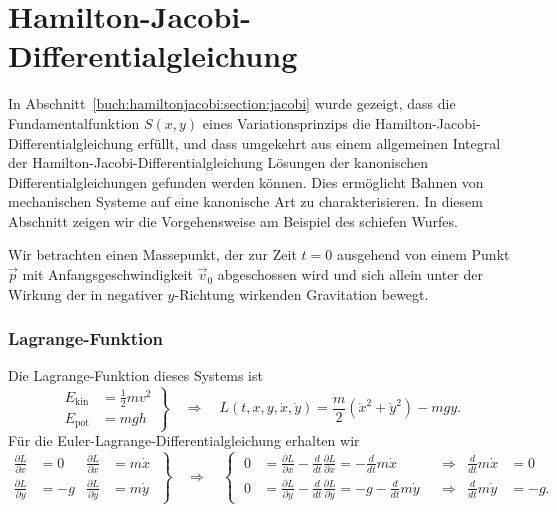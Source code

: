 %
%
%
\section{Hamilton-Jacobi-Differentialgleichung
\label{buch:mechanik:section:jacobi}}
In Abschnitt~\ref{buch:hamiltonjacobi:section:jacobi} wurde gezeigt,
dass die Fundamentalfunktion $S(x,y)$ eines Variationsprinzips 
die Hamilton-Jacobi-Differentialgleichung erfüllt, und dass umgekehrt
aus einem allgemeinen Integral der Hamilton-Jacobi-Differentialgleichung
Lösungen der kanonischen Differentialgleichungen gefunden werden können.
Dies ermöglicht Bahnen von mechanischen Systeme auf eine kanonische
Art zu charakterisieren.
In diesem Abschnitt zeigen wir die Vorgehensweise am Beispiel
des schiefen Wurfes.

Wir betrachten einen Massepunkt, der zur Zeit $t=0$ ausgehend von einem
Punkt $\vec{p}$ mit Anfangsgeschwindigkeit $\vec{v}_0$ abgeschossen
wird und sich allein unter der Wirkung der in negativer $y$-Richtung
wirkenden Gravitation bewegt.

%
%
\subsubsection{Lagrange-Funktion}
Die Lagrange-Funktion dieses Systems ist
\[
\left.
\begin{aligned}
E_{\text{kin}}
&=
\frac12 mv^2
\\
E_{\text{pot}}
&=
mgh
\end{aligned}
\right\}
\quad\Rightarrow\quad
L(t,x,y,\dot{x},\dot{y})
=
\frac{m}2 (\dot{x}^2 + \dot{y}^2)
-
mgy.
\]
Für die Euler-Lagrange-Differentialgleichung erhalten wir
\begin{equation}
\left.
\begin{aligned}
\frac{\partial L}{\partial x}
&=
0
&
\frac{\partial L}{\partial \dot{x}}
&=
m\dot{x}
\\
\frac{\partial L}{\partial y}
&=
-g
&
\frac{\partial L}{\partial \dot{y}}
&=
m\dot{y}
\end{aligned}
\;\right\}
\quad\Rightarrow\quad
\left\{\;
\begin{aligned}
0
&=
\frac{\partial L}{\partial x}-\frac{d}{dt}\frac{\partial L}{\partial\dot{x}}
=
-\frac{d}{dt}m\dot{x}
&&\Rightarrow&\frac{d}{dt}m\dot{x}&=0
\\
0
&=
\frac{\partial L}{\partial y}-\frac{d}{dt}\frac{\partial L}{\partial\dot{y}}
=
-g
-\frac{d}{dt}m\dot{y}
&&\Rightarrow&\frac{d}{dt}m\dot{y}&=-g.
\end{aligned}
\right.
\label{buch:mechanik:jacobi:wurf:eqn:bewegungsgleichung}
\end{equation}


